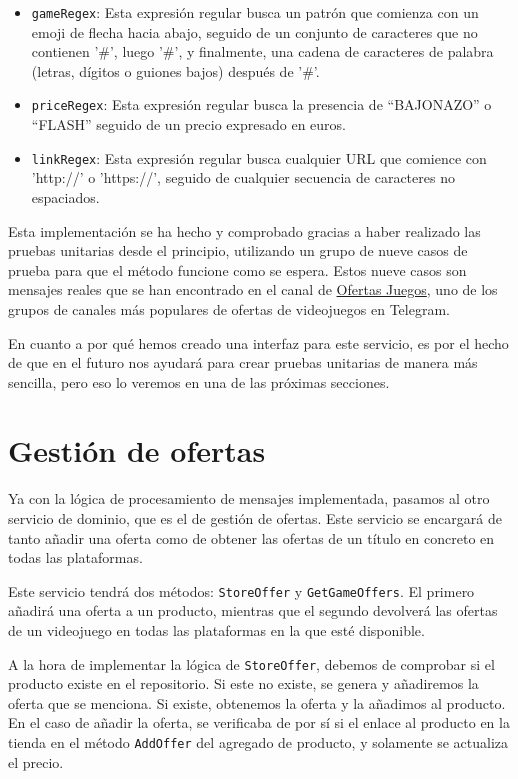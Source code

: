 \begin{itemize}
    \item \verb|gameRegex|: Esta expresión regular busca un patrón que comienza 
    con un emoji de flecha hacia abajo, seguido de un conjunto de caracteres que no 
    contienen '\#', luego '\#', y finalmente, una cadena de caracteres de palabra 
    (letras, dígitos o guiones bajos) después de '\#'.
    \item \verb|priceRegex|: Esta expresión regular busca la presencia de 
    ``BAJONAZO'' o ``FLASH'' seguido de un precio expresado en euros.
    \item \verb|linkRegex|: Esta expresión regular busca cualquier URL que comience 
    con 'http://' o 'https://', seguido de cualquier secuencia de caracteres no 
    espaciados.
\end{itemize}

Esta implementación se ha hecho y comprobado gracias a haber realizado las pruebas 
unitarias desde el principio, utilizando un grupo de nueve casos de prueba para que 
el método funcione como se espera. Estos nueve casos son mensajes reales que se han 
encontrado en el canal de \href{https://ofertasjuegos.es/}{Ofertas Juegos}, uno de 
los grupos de canales más populares de ofertas de videojuegos en Telegram.

En cuanto a por qué hemos creado una interfaz para este servicio, es por el hecho 
de que en el futuro nos ayudará para crear pruebas unitarias de manera más 
sencilla, pero eso lo veremos en una de las próximas secciones.

\section{Gestión de ofertas}

Ya con la lógica de procesamiento de mensajes implementada, pasamos al otro 
servicio de dominio, que es el de gestión de ofertas. Este servicio se encargará de 
tanto añadir una oferta como de obtener las ofertas de un título en concreto en 
todas las plataformas.

Este servicio tendrá dos métodos: \verb|StoreOffer| y \verb|GetGameOffers|. El 
primero añadirá una oferta a un producto, mientras que el segundo devolverá las 
ofertas de un videojuego en todas las plataformas en la que esté disponible.

A la hora de implementar la lógica de \verb|StoreOffer|, debemos de comprobar si el 
producto existe en el repositorio. Si este no existe, se genera y añadiremos la 
oferta que se menciona. Si existe, obtenemos la oferta y la añadimos al producto. 
En el caso de añadir la oferta, se verificaba de por sí si el enlace al producto en 
la tienda en el método \verb|AddOffer| del agregado de producto, y solamente se 
actualiza el precio.

